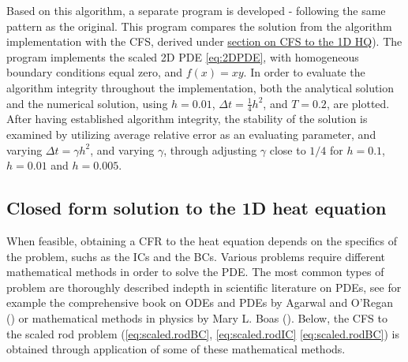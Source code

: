 \documentclass[%
oneside,                 %
final,                   %
10pt]{article}
\begin{document}
\begin{center}\end{center}
Based on this algorithm, a separate program is developed - following the same pattern as the original. This program compares the solution from the algorithm implementation with the CFS, derived under \hyperref[M.CFS2D]{section on CFS to the 1D HQ}). The program implements the scaled 2D PDE \eqref{eq:2DPDE}, with homogeneous boundary conditions equal zero, and $f(x)=xy$. In order to evaluate the algorithm integrity throughout the implementation, both the analytical solution and the numerical solution, using $h=0.01$, $\Delta t=\frac{1}{4} h^2$, and $T=0.2$, are plotted.\newline
After having established algorithm integrity, the stability of the solution is examined by utilizing average relative error as an evaluating parameter, and varying $\Delta t=\gamma h^2$, and varying $\gamma$, through adjusting $\gamma$ close to $1/4$ for $h=0.1$, $h=0.01$ and $h=0.005$.

\subsection{Closed form solution to the 1D heat equation}
\label{M.CFS1d}
When feasible, obtaining a CFR to the heat equation depends on the specifics of the problem, suchs as the ICs and the BCs. Various problems require different mathematical methods in order to solve the PDE. The most common types of problem are thoroughly described indepth in scientific literature on PDEs, see for example the comprehensive book on ODEs and PDEs by Agarwal and O’Regan (\cite{ravi}) or mathematical methods in physics by Mary L. Boas (\cite{matmet}). Below, the CFS to the scaled rod problem (\eqref{eq:scaled.rodBC}, \eqref{eq:scaled.rodIC} \eqref{eq:scaled.rodBC}) is obtained through  application of some of these mathematical methods. \newline
\end{document}

